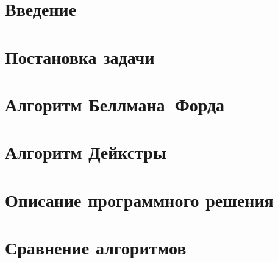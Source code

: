 

\usepackage[utf8]{inputenc}                %
\usepackage[T1,T2A]{fontenc}
\usepackage[main=russian, english]{babel}  %
\usepackage[pdftex]{graphicx}              %
\usepackage{indentfirst}                   %

\usepackage[unicode]{hyperref}                                         %

\usepackage{amsfonts}
\usepackage{amssymb}
\usepackage{amsmath}


    
    \tableofcontents
    \clearpage

    \section{Введение}
    
    \newpage
    \section{Постановка задачи}
    
    \section{Алгоритм Беллмана--Форда}
    
    \section{Алгоритм Дейкстры}
    
    \section{Описание программного решения}
    
    \section{Сравнение алгоритмов}
    
    \newpage
